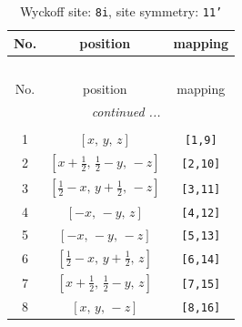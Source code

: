 \documentclass[fleqn,8pt]{jsarticle}
\begin{document}
\renewcommand{\arraystretch}{1.2}
\begin{longtable}{ccc}
\caption{Wyckoff site: {\tt 8i}, site symmetry: {\tt 11'}}
 \\
 \hline \hline
No. & position & mapping \\ \hline \endfirsthead

\multicolumn{2}{l}{\tablename\ \thetable{}} \\
 \hline \hline
No. & position & mapping \\ \hline \endhead

 \hline \hline
\multicolumn{2}{r}{\footnotesize\it continued ...} \\ \endfoot

 \hline \hline
\multicolumn{2}{r}{} \\ \endlastfoot

1 & $\left[ x,\, y,\, z \right]$ & {\tt [1,9]} \\ \hline
2 & $\left[ x + \frac{1}{2},\, \frac{1}{2} - y,\, - z \right]$ & {\tt [2,10]} \\ \hline
3 & $\left[ \frac{1}{2} - x,\, y + \frac{1}{2},\, - z \right]$ & {\tt [3,11]} \\ \hline
4 & $\left[ - x,\, - y,\, z \right]$ & {\tt [4,12]} \\ \hline
5 & $\left[ - x,\, - y,\, - z \right]$ & {\tt [5,13]} \\ \hline
6 & $\left[ \frac{1}{2} - x,\, y + \frac{1}{2},\, z \right]$ & {\tt [6,14]} \\ \hline
7 & $\left[ x + \frac{1}{2},\, \frac{1}{2} - y,\, z \right]$ & {\tt [7,15]} \\ \hline
8 & $\left[ x,\, y,\, - z \right]$ & {\tt [8,16]} \\
\end{longtable}
\end{document}
